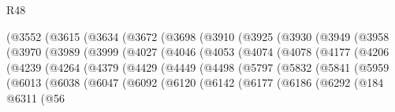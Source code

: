 \begin{lexlean}{R48}
\begin{coremodule}
                (@3552
                  (@3615
                    (@3634
                      (@3672
                        (@3698
                          (@3910
                            (@3925
                              (@3930
                                (@3949
                                  (@3958
                                    (@3970
                                      (@3989
                                        (@3999
                                          (@4027
                                            (@4046
                                              (@4053
                                                (@4074
                                                  (@4078
                                                    (@4177
                                                      (@4206
                                                        (@4239
                                                          (@4264
                                                            (@4379
                                                              (@4429
                                                                (@4449
                                                                  (@4498
                                                                    (@5797
                                                                      (@5832
                                                                        (@5841
                                                                          (@5959
                                                                            (@6013
                                                                              (@6038
                                                                                (@6047
                                                                                  (@6092
                                                                                    (@6120
                                                                                      (@6142
                                                                                        (@6177
                                                                                          (@6186
                                                                                            (@6292
                                                                                              (@184
                                                                                                @6311
                                                                                                (@56

\end{coremodule}
\end{lexlean}
